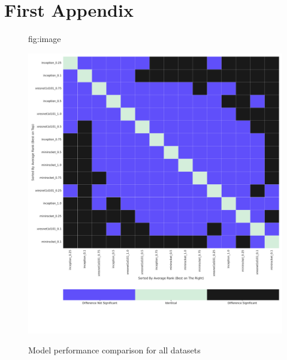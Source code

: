 \documentclass[pmlr,twocolumn]{jmlr}%
\begin{document}
\section{First Appendix}\label{apd:model_vs_model}
\begin{figure}[tbp]
\floatconts
  {fig:image}
  {\caption{Model performance comparison for all datasets}}
  {\includegraphics[width=1\linewidth]{images/model_comparisons_alldatasets.pdf}}
 
\end{figure}
\end{document}
